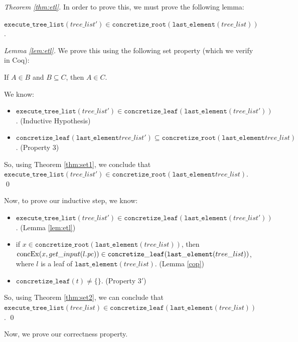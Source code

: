 \begin{proof}[Theorem \ref{thm:etl}]
In order to prove this, we must prove the following lemma:
\begin{lemma} 
\label{lem:etl}
$\mathtt{execute\_tree\_list} (tree\_list') \in \mathtt{concretize\_root} (\mathtt{last\_element} (tree\_list))$.
\end{lemma}
\begin{proof}[Lemma \ref{lem:etl}]
We prove this using the following set property (which we verify in Coq):

\begin{theorem} \label{thm:set1}
If $A \in B$ and $B \subseteq C$, then $A \in C$.
\end{theorem}

We know:
\begin{itemize}
\item$ \mathtt{execute\_tree\_list}(tree\_list') \in
        \mathtt{concretize\_leaf} (\mathtt{last\_element}(tree\_list')) $. (Inductive Hypothesis)
\item 
$\mathtt{concretize\_leaf} (\mathtt{last\_element} tree\_list') \subseteq \mathtt{concretize\_root} (\mathtt{last\_element} tree\_list)$. (Property $3$)
 \end{itemize}
 
 So, using Theorem \ref{thm:set1}, we conclude that $\mathtt{execute\_tree\_list} (tree\_list') \in \mathtt{concretize\_root} (\mathtt{last\_element} tree\_list)$. \qed
\end{proof}

Now, to prove our inductive step, we know:
\begin{itemize}
\item $\mathtt{execute\_tree\_list} (tree\_list') \in \mathtt{concretize\_leaf} (\mathtt{last\_element}(tree\_list'))$. (Lemma \ref{lem:etl})
\item if $x \in \mathtt{concretize\_root}(\mathtt{last\_element}(tree\_list))$, then  $\mathrm{concEx}(x, get\_input (l.\mathit{pc})) \in \mathtt{concretize\_leaf}(\mathtt{last\_element}(tree\_list))$,
where $l$ is a leaf of $\mathtt{last\_element}(tree\_list)$. (Lemma \ref{cop})
\item $\mathtt{concretize\_leaf}(t) \neq \{\} $. (Property $3'$)
\end{itemize}

So, using Theorem \ref{thm:set2}, we can conclude that $\mathtt{execute\_tree\_list} (tree\_list) \in \mathtt{concretize\_leaf} (\mathtt{last\_element}(tree\_list))$. \qed
\end{proof}

Now, we prove our correctness property.


